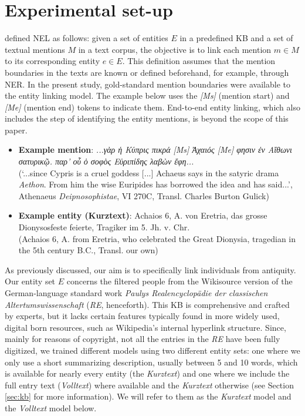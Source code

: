 \documentclass[final]{anthology-ch}
\begin{document}
\section{Experimental set-up} \label{sec:set-up}
\textcite{Shen_Wang_Han_2015} defined NEL as follows: given a set of entities $E$ in a predefined KB and a set of textual mentions $M$ in a text corpus, the objective is to link each mention $m\in M$ to its corresponding entity $e \in E$. This definition assumes that the mention boundaries in the texts are known or defined beforehand, for example, through NER. In the present study, gold-standard mention boundaries were available to the entity linking model. The example below uses the \textit{[Ms]} (mention start) and \textit{[Me]} (mention end) tokens to indicate them. End-to-end entity linking, which also includes the step of identifying the entity mentions, is beyond the scope of this paper.
\begin{itemize}
\item \textbf{Example mention}: \emph{...γὰρ ἡ Κύπρις πικρά [Ms] Ἀχαιός [Me] φησιν ἐν Αἴθωνι σατυρικῷ. παρ’ οὗ ὁ σοφὸς Εὐριπίδης λαβὼν ἔφη...} \\
(`...since Cypris is a cruel goddess [...] Achaeus says in the satyric drama \textit{Aethon}. From him the wise Euripides has borrowed the idea and has said...', Athenaeus \textit{Deipnosophistae}, VI 270C, Transl. Charles Burton Gulick)
\item \textbf{Example entity (Kurztext)}: Achaios 6, A. von Eretria, das grosse Dionysosfeste feierte, Tragiker im 5. Jh. v. Chr. \\(Achaios 6, A. from Eretria, who celebrated the Great Dionysia, tragedian in the 5th century B.C., Transl. our own)
\end{itemize}
As previously discussed, our aim is to specifically link individuals from antiquity. Our entity set $E$ concerns the filtered people from the Wikisource version of the German-language standard work \textit{Paulys Realencyclopädie der classischen Altertumswissenschaft} (\textit{RE}, henceforth). This KB is comprehensive and crafted by experts, but it lacks certain features typically found in more widely used, digital born resources, such as Wikipedia’s internal hyperlink structure. Since, mainly for reasons of copyright, not all the entries in the \textit{RE} have been fully digitized, we trained different models using two different entity sets: one where we only use a short summarizing description, usually between 5 and 10 words, which is available for nearly every entity (the \textit{Kurztext}) and one where we include the full entry text (\textit{Volltext}) where available and the \textit{Kurztext} otherwise (see Section \ref{sec:kb} for more information). We will refer to them as the \textit{Kurztext} model and the \textit{Volltext} model below.
\end{document}
